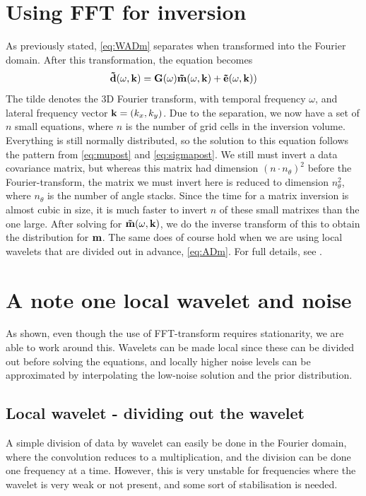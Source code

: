 \section{Using FFT for inversion}
As previously stated, \autoref{eq:WADm} separates when transformed
into the Fourier domain. After this transformation, the equation
becomes
\begin{equation}
\label{eq:fourierinv}
\mathbf{\tilde{d}}(\omega,\mathbf{k}) = \mathbf{G}(\omega)\mathbf{\tilde{m}}(\omega,\mathbf{k}) + \mathbf{\tilde{e}}(\omega,\mathbf{k}))
\end{equation}
The tilde denotes the 3D Fourier transform, with temporal
frequency $\omega$, and lateral frequency vector $\mathbf{k} =
(k_x,k_y)$. Due to the separation, we now have a set of $n$ small
equations, where $n$ is the number of grid cells in the inversion
volume. Everything is still normally distributed, so the solution to
this equation follows the pattern from \autoref{eq:mupost} and
\autoref{eq:sigmapost}. We still must invert a data covariance matrix,
but whereas this matrix had dimension $(n\cdot n_\theta)^2$ before the
Fourier-transform, the matrix we must invert here is reduced to
dimension $n_\theta^2$, where $n_\theta$ is the number of angle
stacks. Since the time for a matrix inversion is almost cubic in size,
it is much faster to invert $n$ of these small matrixes than the one
large. After solving for $\mathbf{\tilde{m}}(\omega,\mathbf{k})$, we do
the inverse transform of this to obtain the distribution for
$\mathbf{m}$. The same does of course hold when we are using local
wavelets that are divided out in advance, \autoref{eq:ADm}. For full
details, see \cite{geo68ab2}.

\section{A note one local wavelet and noise}
\label{sec:nonstationaryimp}
As shown, even though the use of FFT-transform requires stationarity,
we are able to work around this. Wavelets can be made local since
these can be divided out before solving the equations, and locally
higher noise levels can be approximated by interpolating the low-noise
solution and the prior distribution.

\subsection{Local wavelet - dividing out the wavelet}
\label{sec:divwavimp}
A simple division of data by wavelet can easily be done in the Fourier
domain, where the convolution reduces to a multiplication, and the
division can be done one frequency at a time. However, this is very
unstable for frequencies where the wavelet is very weak or not
present, and some sort of stabilisation is needed.

